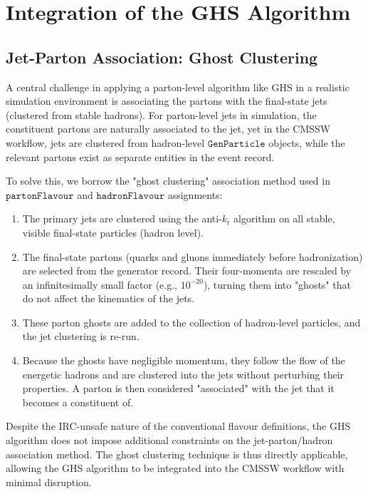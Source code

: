 \documentclass[10pt,twocolumn]{article}
\newcommand*{\parFlav}{\texttt{partonFlavour}}
\newcommand*{\hadFlav}{\texttt{hadronFlavour}}
\begin{document}
\section{Integration of the GHS Algorithm}
\label{sec:integration}

\subsection{Jet-Parton Association: Ghost Clustering}
\label{sec:integration-ghost}

A central challenge in applying a parton-level algorithm like GHS in a realistic simulation environment is associating the partons with the final-state jets (clustered from stable hadrons). For parton-level jets in simulation, the constituent partons are naturally associated to the jet, yet in the CMSSW workflow, jets are clustered from hadron-level $\texttt{GenParticle}$ objects, while the relevant partons exist as separate entities in the event record.

To solve this, we borrow the "ghost clustering" association method used in $\parFlav$ and $\hadFlav$ assignments:

\begin{enumerate}
    \item The primary jets are clustered using the anti-$k_t$ algorithm on all stable, visible final-state particles (hadron level).
    \item The final-state partons (quarks and gluons immediately before hadronization) are selected from the generator record. Their four-momenta are rescaled by an infinitesimally small factor (e.g., $10^{-20}$), turning them into "ghosts" that do not affect the kinematics of the jets.
    \item These parton ghosts are added to the collection of hadron-level particles, and the jet clustering is re-run.
    \item Because the ghosts have negligible momentum, they follow the flow of the energetic hadrons and are clustered into the jets without perturbing their properties. A parton is then considered "associated" with the jet that it becomes a constituent of.
\end{enumerate}

Despite the IRC-unsafe nature of the conventional flavour definitions, the GHS algorithm does not impose additional constraints on the jet-parton/hadron association method. The ghost clustering technique is thus directly applicable, allowing the GHS algorithm to be integrated into the CMSSW workflow with minimal disruption.
\end{document}
